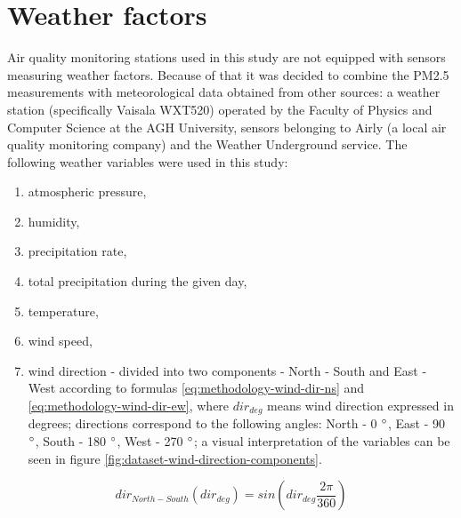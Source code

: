 \section{Weather factors}\label{sec:weather-data}
Air quality monitoring stations used in this study are not equipped with sensors measuring weather factors. Because of that it was decided to combine the PM2.5 measurements with meteorological data obtained from other sources: a weather station (specifically Vaisala WXT520) operated by the Faculty of Physics and Computer Science at the AGH University, sensors belonging to Airly (a local air quality monitoring company) and the Weather Underground service. The following weather variables were used in this study:
\begin{enumerate}
    \item atmospheric pressure,
    \item humidity,
    \item precipitation rate,
    \item total precipitation during the given day,
    \item temperature,
    \item wind speed,
    \item wind direction - divided into two components - North - South and East - West according to formulas \ref{eq:methodology-wind-dir-ns} and \ref{eq:methodology-wind-dir-ew}, where ${dir}_{deg}$ means wind direction expressed in degrees; directions correspond to the following angles: North - 0 $\degree$, East - 90 $\degree$, South - 180 $\degree$, West - 270 $\degree$; a visual interpretation of the variables can be seen in figure \ref{fig:dataset-wind-direction-components}.
\end{enumerate}

\begin{equation} \label{eq:methodology-wind-dir-ns}
{dir}_{North-South}({dir}_{deg}) =  sin({dir}_{deg}\frac{2 \pi}{360})
\end{equation}

